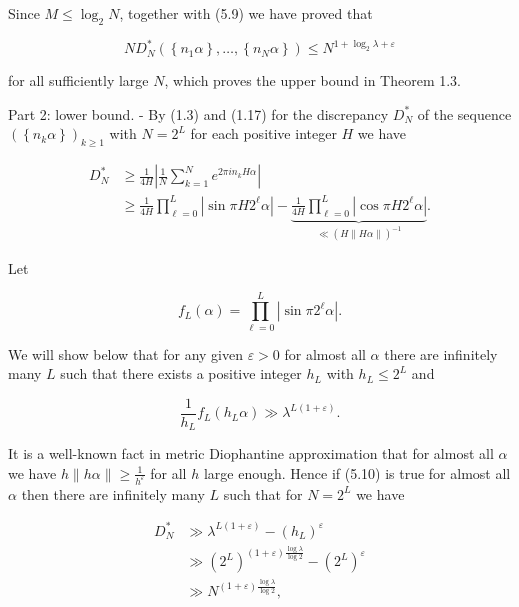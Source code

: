 \documentclass[10pt]{article}
\begin{document}
Since $M \leqslant \log _{2} N$, together with (5.9) we have proved that

$$
N D_{N}^{*}\left(\left\{n_{1} \alpha\right\}, \ldots,\left\{n_{N} \alpha\right\}\right) \leqslant N^{1+\log _{2} \lambda+\varepsilon}
$$

for all sufficiently large $N$, which proves the upper bound in Theorem 1.3.

Part 2: lower bound. - By (1.3) and (1.17) for the discrepancy $D_{N}^{*}$ of the sequence $\left(\left\{n_{k} \alpha\right\}\right)_{k \geqslant 1}$ with $N=2^{L}$ for each positive integer $H$ we have

$$
\begin{aligned}
D_{N}^{*} & \geqslant \frac{1}{4 H}\left|\frac{1}{N} \sum_{k=1}^{N} e^{2 \pi i n_{k} H \alpha}\right| \\
& \geqslant \frac{1}{4 H} \prod_{\ell=0}^{L}\left|\sin \pi H 2^{\ell} \alpha\right|-\underbrace{\frac{1}{4 H} \prod_{\ell=0}^{L}\left|\cos \pi H 2^{\ell} \alpha\right|}_{\ll(H\|H \alpha\|)^{-1}} .
\end{aligned}
$$

Let

$$
f_{L}(\alpha)=\prod_{\ell=0}^{L}\left|\sin \pi 2^{\ell} \alpha\right| .
$$

We will show below that for any given $\varepsilon>0$ for almost all $\alpha$ there are infinitely many $L$ such that there exists a positive integer $h_{L}$ with $h_{L} \leqslant 2^{L}$ and


\begin{equation*}
\frac{1}{h_{L}} f_{L}\left(h_{L} \alpha\right) \gg \lambda^{L(1+\varepsilon)} . \tag{5.10}
\end{equation*}


It is a well-known fact in metric Diophantine approximation that for almost all $\alpha$ we have $h\|h \alpha\| \geqslant \frac{1}{h^{\varepsilon}}$ for all $h$ large enough. Hence if (5.10) is true for almost all $\alpha$ then there are infinitely many $L$ such that for $N=2^{L}$ we have


\begin{align*}
D_{N}^{*} & \gg \lambda^{L(1+\varepsilon)}-\left(h_{L}\right)^{\varepsilon}  \tag{5.11}\\
& \gg\left(2^{L}\right)^{(1+\varepsilon) \frac{\log \lambda}{\log 2}}-\left(2^{L}\right)^{\varepsilon} \\
& \gg N^{(1+\varepsilon) \frac{\log \lambda}{\log 2}},
\end{align*}
\end{document}
